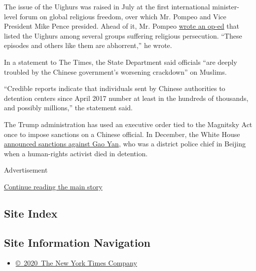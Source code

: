 The issue of the Uighurs was raised in July at the first international
minister-level forum on global religious freedom, over which Mr. Pompeo
and Vice President Mike Pence presided. Ahead of it, Mr. Pompeo
\href{https://www.usatoday.com/story/opinion/2018/07/24/defend-religious-freedom-global-attacks-mike-pompeo-column/818972002/}{wrote
an op-ed} that listed the Uighurs among several groups suffering
religious persecution. ``These episodes and others like them are
abhorrent,'' he wrote.

In a statement to The Times, the State Department said officials ``are
deeply troubled by the Chinese government's worsening crackdown'' on
Muslims.

``Credible reports indicate that individuals sent by Chinese authorities
to detention centers since April 2017 number at least in the hundreds of
thousands, and possibly millions,'' the statement said.

The Trump administration has used an executive order tied to the
Magnitsky Act once to impose sanctions on a Chinese official. In
December, the White House
\href{https://www.rfa.org/english/news/china/chief-12222017103212.html}{announced
sanctions against Gao Yan}, who was a district police chief in Beijing
when a human-rights activist died in detention.

Advertisement

\protect\hyperlink{after-bottom}{Continue reading the main story}

\hypertarget{site-index}{%
\subsection{Site Index}\label{site-index}}

\hypertarget{site-information-navigation}{%
\subsection{Site Information
Navigation}\label{site-information-navigation}}

\begin{itemize}
\tightlist
\item
  \href{https://help.nytimes.com/hc/en-us/articles/115014792127-Copyright-notice}{©~2020~The
  New York Times Company}
\end{itemize}


